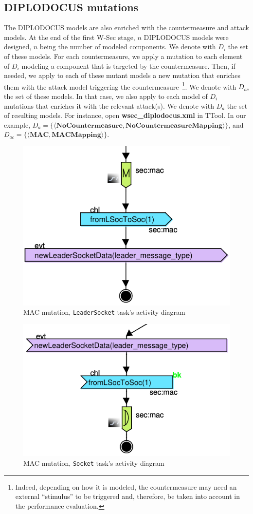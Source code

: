 \documentclass{article}
\begin{document}
\subsection{DIPLODOCUS mutations}

The DIPLODOCUS models are also enriched with the countermeasure and attack models. At the end of the first W-Sec stage, $n$ DIPLODOCUS models were designed, $n$ being the number of modeled components. We denote with $D_i$ the set of these models. For each countermeasure, we apply a mutation to each element of $D_i$ modeling a component that is targeted by the countermeasure. Then, if needed, we apply to each of these mutant models a new mutation that enriches them with the attack model triggering the countermeasure~\footnote{Indeed, depending on how it is modeled, the countermeasure may need an external ``stimulus'' to be triggered and, therefore, be taken into account in the performance evaluation.}. We denote with $D_{a c}$ the set of these models. In that case, we also apply to each model of $D_i$ mutations that enriches it with the relevant attack(s). We denote with $D_a$ the set of resulting models. For instance, open \textbf{wsec\_diplodocus.xml} in TTool. In our example, $D_a = \{\langle \textbf{NoCountermeasure}, \textbf{NoCountermeasureMapping} \rangle\}$, and $D_{a c} = \{\langle \textbf{MAC}, \textbf{MACMapping} \rangle\}$.

\begin{figure}
	\centering
	\includegraphics[width=.5\textwidth]{figures/leadersocketmac.pdf}
	\caption{MAC mutation, \texttt{LeaderSocket} task's activity diagram}
	\label{fig:leadersocketmac}
\end{figure}

\begin{figure}
	\centering
	\includegraphics[width=.5\textwidth]{figures/socketmac.pdf}
	\caption{MAC mutation, \texttt{Socket} task's activity diagram}
	\label{fig:socketmac}
\end{figure}
\end{document}
